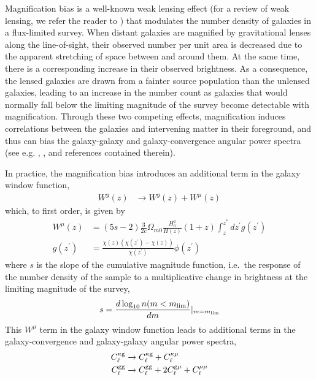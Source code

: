 \documentclass[a4paper,usenatbib]{mnras}
\begin{document}
Magnification bias is a well-known weak lensing effect (for a review of weak lensing, we refer the reader to \citealt{BartelmannSchneider01}) that modulates the number density of galaxies in a flux-limited survey. When distant galaxies are magnified by gravitational lenses along the line-of-sight, their observed number per unit area is decreased due to the apparent stretching of space between and around them. At the same time, there is a corresponding increase in their observed brightness. As a consequence, the lensed galaxies are drawn from a fainter source population than the unlensed galaxies, leading to an increase in the number count as galaxies that would normally fall below the limiting magnitude of the survey become detectable with magnification. Through these two competing effects, magnification induces correlations between the galaxies and intervening matter in their foreground, and thus can bias the galaxy-galaxy and galaxy-convergence angular power spectra (see e.g. \citealt{Loverde++08}, \citealt{Ziour++08}, and references contained therein).

In practice, the magnification bias introduces an additional term in the galaxy window function,
\begin{align}
    W^{g}(z)  &\xrightarrow{ } W^{g}(z) + W^{\mu}(z)
\end{align}
which, to first order, is given by
\begin{align}
    W^{\mu}(z) &= (5s-2)\frac{3}{2c} \Omega_{m0} \frac{H_0^2}{H(z)} (1+z) \int_z^{z^{*}} dz^{\prime}g(z^{\prime}) \\
    g(z^{\prime}) &= \frac{\chi(z)(\chi(z^{\prime})-\chi(z))}{\chi(z^{\prime})} \phi(z^{\prime})
\end{align}
%
where $s$ is the slope of the cumulative magnitude function, i.e.\ the response of the number density of the sample to a multiplicative change in brightness at the limiting magnitude of the survey,
\begin{align}
s = \frac{d\log_{10}n(m<m_{\rm lim})}{dm}|_{m=m_{\rm lim}}
\end{align}
This $W^{\mu}$ term in the galaxy window function leads to additional terms in the galaxy-convergence and galaxy-galaxy angular power spectra,
\begin{align}
    C_{\ell}^{\rm \kappa g} &\xrightarrow{} C_{\ell}^{\rm \kappa g} + C_{\ell}^{\kappa \mu} \label{eq:mag-bias-corrections1} \\
    C_{\ell}^{\rm gg} &\xrightarrow{} C_{\ell}^{\rm gg} + 2 C_{\ell}^{\rm g\mu} + C_{\ell}^{\mu\mu} \label{eq:mag-bias-corrections2}
\end{align}
\end{document}
